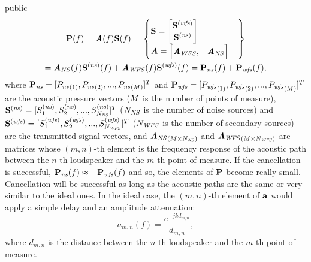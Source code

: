 \begin{shownto}{public}
\begin{multline}
	\Field[noValue][frequency][vector](f)
	= \AcPath[mat](f) \vec{\signal[nothing][frequency]}(f)
	= \left. \begin{cases}
		\vec{\signal[nothing][frequency]} = 
		\begin{bmatrix}
			\vec{\signal[wfs][frequency]} \\
			\vec{\signal[ns][frequency]}
		\end{bmatrix} \\
		\AcPath[mat] =
		\begin{bmatrix}
			\AcPath[mat][WFS], & \AcPath[mat][NS]
		\end{bmatrix}
	\end{cases} \right\} \\
	= \AcPath[mat][NS](f) \vec{\signal[ns][frequency]}(f) + \AcPath[mat][WFS](f) \vec{\signal[wfs][frequency]}(f)
	= \Field[ns][frequency][vector](f) + \Field[wfs][frequency][vector](f),
	\label{acPathModel}
\end{multline}
where $\Field[ns][frequency][vector] = [\Field[ns][frequency][scalar][1], \Field[ns][frequency][scalar][2], ..., \Field[ns][frequency][scalar][\numMeasPoints]]^T$ and $\Field[wfs][frequency][vector] = [\Field[wfs][frequency][scalar][1], \Field[wfs][frequency][scalar][2], ..., \Field[wfs][frequency][scalar][\numMeasPoints]]^T$ are the acoustic pressure vectors ($M$ is the number of points of measure), $\vec{\signal[ns][frequency]} = [\signal[ns][frequency]_1, \signal[ns][frequency]_2, ..., \signal[ns][frequency]_{\numNS}]^T$ ($N_\mathit{NS}$ is the number of noise sources) and $\vec{\signal[wfs][frequency]} = [\signal[wfs][frequency]_1, \signal[wfs][frequency]_2, ..., \signal[wfs][frequency]_{\numWFS}]^T$ ($N_\mathit{WFS}$ is the number of secondary sources) are the transmitted signal vectors, and ${\AcPath[mat][NS]}_{(\numMeasPoints \times \numNS)}$ and ${\AcPath[mat][WFS]}_{(\numMeasPoints \times \numWFS)}$ are matrices whose $(m,n)$-th element is the frequency response of the acoustic path between the $n$-th loudspeaker and the $m$-th point of measure. If the cancellation is successful, $\Field[ns][frequency][vector](f) \approx -\Field[wfs][frequency][vector](f)$ and so, the elements of $\Field[noValue][frequency][vector]$ become really small. Cancellation will be successful as long as the acoustic paths are the same or very similar to the ideal ones. In the ideal case, the $(m,n)$-th element of $\AcPath$ would apply a simple delay and an amplitude attenuation:
\begin{equation}
a_{m,n}(f) = \frac{e^{-j k d_{m,n}}}{d_{m,n}},
\end{equation}
where $d_{m,n}$ is the distance between the $n$-th loudspeaker and the $m$-th point of measure.
\end{shownto}


